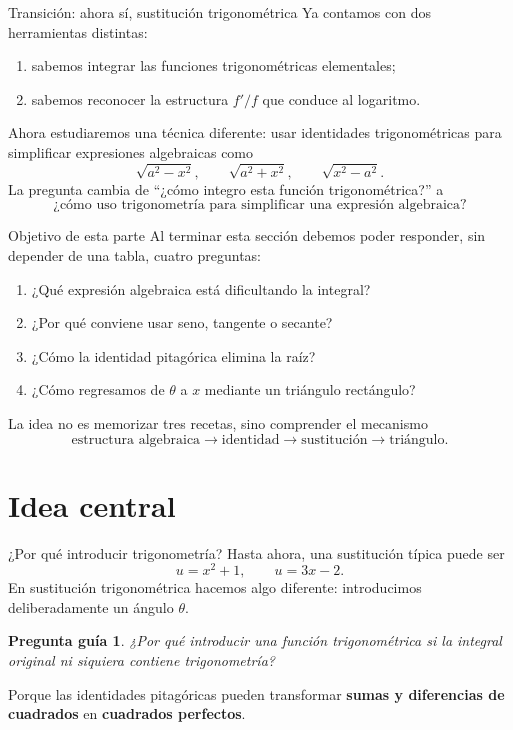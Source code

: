 \documentclass[10pt,aspectratio=169]{beamer}
\newtheorem{pregunta}{Pregunta guía}
\begin{document}
\begin{frame}{Transición: ahora sí, sustitución trigonométrica}
Ya contamos con dos herramientas distintas:
\begin{enumerate}
\item sabemos integrar las funciones trigonométricas elementales;
\item sabemos reconocer la estructura $f'/f$ que conduce al logaritmo.
\end{enumerate}
Ahora estudiaremos una técnica diferente: usar identidades trigonométricas para simplificar expresiones algebraicas como
\[
\sqrt{a^2-x^2},\qquad
\sqrt{a^2+x^2},\qquad
\sqrt{x^2-a^2}.
\]
La pregunta cambia de ``¿cómo integro esta función trigonométrica?'' a
\[
\boxed{\text{¿cómo uso trigonometría para simplificar una expresión algebraica?}}
\]
\end{frame}


\begin{frame}{Objetivo de esta parte}
Al terminar esta sección debemos poder responder, sin depender de una tabla, cuatro preguntas:
\begin{enumerate}
\item ¿Qué expresión algebraica está dificultando la integral?
\item ¿Por qué conviene usar seno, tangente o secante?
\item ¿Cómo la identidad pitagórica elimina la raíz?
\item ¿Cómo regresamos de $\theta$ a $x$ mediante un triángulo rectángulo?
\end{enumerate}
\vspace{2mm}
La idea no es memorizar tres recetas, sino comprender el mecanismo
\[
\boxed{\text{estructura algebraica}\to\text{identidad}\to\text{sustitución}\to\text{triángulo}.}
\]
\end{frame}

\section{Idea central}
\begin{frame}{¿Por qué introducir trigonometría?}
Hasta ahora, una sustitución típica puede ser
\[
u=x^2+1,\qquad u=3x-2.
\]
En sustitución trigonométrica hacemos algo diferente: introducimos deliberadamente un ángulo $\theta$.
\vspace{2mm}
\begin{pregunta}
¿Por qué introducir una función trigonométrica si la integral original ni siquiera contiene trigonometría?
\end{pregunta}
\pause
Porque las identidades pitagóricas pueden transformar \textbf{sumas y diferencias de cuadrados} en \textbf{cuadrados perfectos}.
\end{frame}
\end{document}
